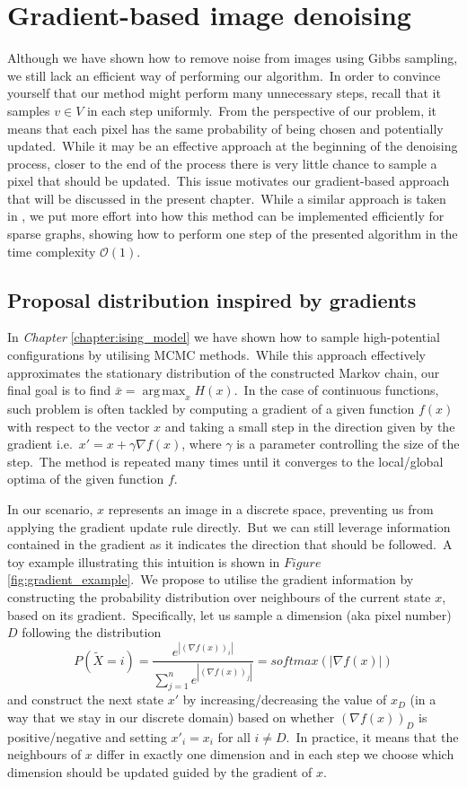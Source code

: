 \documentclass[a4paper, 11pt, onecolumn, openany, titlepage]{report}
\newcommand\numberedchapter[1]{\setlength\topskip{3cm}\chapter{#1}\setlength\topskip{0cm}}
\theoremstyle{default_theorem_style}\newtheorem{theorem}{Theorem}
\theoremstyle{default_theorem_style}\newtheorem{definition}{Definition}
\DeclareMathOperator*{\argmax}{arg\,max}
\begin{document}
\numberedchapter{Gradient-based image denoising}

Although we have shown how to remove noise from images using Gibbs sampling, we still lack an efficient way of
performing our algorithm.\ In order to convince yourself that our method
might perform many unnecessary steps, recall that it samples $v \in V$ in each step uniformly.\ From the perspective
of our problem, it means that each pixel has the same probability of being chosen and potentially updated.\ While
it may be an effective approach at the beginning of the denoising process, closer to the end of the process there is
very little chance to sample a pixel that should be updated.\ This issue motivates our gradient-based approach
that will be discussed in the present chapter.\ While a similar approach is taken in \cite{oops_gradient}, we put
more effort into how this method can be implemented efficiently for sparse graphs, showing how to perform one
step of the presented algorithm in the time complexity $\mathcal{O}(1)$.

\section{Proposal distribution inspired by gradients}

In \textit{Chapter} \ref{chapter:ising_model} we have shown how to sample high-potential configurations by
utilising MCMC methods.\ While this approach effectively approximates the stationary distribution of the constructed
Markov chain, our final goal is to find $\bar{x} = \argmax_x H(x)$.\ In the case of continuous functions, such problem
is often tackled by computing a gradient of a given function $f(x)$ with respect to the vector $x$ and taking a small
step in the direction given by the gradient i.e.\ $x' = x + \gamma \nabla f(x)$, where $\gamma$ is a parameter
controlling the size of the step.\ The method is repeated many times until it converges to the local/global optima of
the given function $f$.\newline

In our scenario, $x$ represents an image in a discrete space, preventing us from applying the gradient update
rule directly.\ But we can still leverage information contained in the gradient as it indicates the direction that
should be followed.\ A toy example illustrating this intuition is shown in $Figure$ \ref{fig:gradient_example}.\ We
propose to utilise the gradient information by constructing the probability distribution over neighbours of the current
state $x$, based on its gradient.\ Specifically, let us sample a dimension (aka pixel number) $D$ following the
distribution
$$
P(\tilde{X} = i) = \frac{e^{|(\nabla f(x))_i|}}{\sum\limits_{j = 1}^{n} e^{|(\nabla f(x))_j|}} =
softmax(|\nabla f(x)|)
$$
and construct the next state $x'$ by increasing/decreasing the value of
$x_D$ (in a way that we stay in our discrete domain) based on whether $(\nabla f(x))_D$ is positive/negative and setting
$x'_i = x_i$ for all $i \neq D$.\ In practice, it means that the neighbours of $x$ differ in exactly one dimension
and in each step we choose which dimension should be updated guided by the gradient of $x$.\newline
\end{document}
